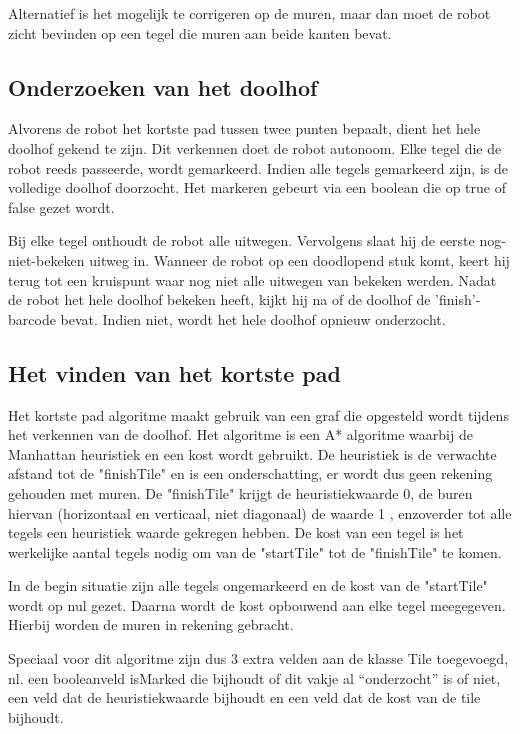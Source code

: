 \documentclass[tt3]{penoverslag}
\begin{document}
Alternatief is het mogelijk te corrigeren op de muren, maar dan moet de robot zicht bevinden op een tegel die muren aan beide kanten bevat.


\subsection{Onderzoeken van het doolhof} %
\label{ssec:algoOnderzDoolhof}
Alvorens de robot het kortste pad tussen twee punten bepaalt, dient het hele doolhof gekend te zijn. Dit verkennen doet de robot autonoom. Elke tegel die de robot reeds passeerde, wordt gemarkeerd. Indien alle tegels gemarkeerd zijn, is de volledige doolhof doorzocht. Het markeren gebeurt via een boolean die op true of false gezet wordt.

Bij elke tegel onthoudt de robot alle uitwegen. Vervolgens slaat hij de eerste nog-niet-bekeken uitweg in. Wanneer de robot op een doodlopend stuk komt, keert hij terug tot een kruispunt waar nog niet alle uitwegen van bekeken werden.
Nadat de robot het hele doolhof bekeken heeft, kijkt hij na of de doolhof de 'finish'-barcode bevat. Indien niet, wordt het hele doolhof opnieuw onderzocht.

\subsection{Het vinden van het kortste pad} %
\label{ssec:AlgoKortsteP}

Het kortste pad algoritme maakt gebruik van een graf die opgesteld wordt tijdens het verkennen van de doolhof. Het algoritme is een A* algoritme waarbij de Manhattan heuristiek en een kost wordt gebruikt.
De heuristiek is de verwachte afstand tot de "finishTile" en is een onderschatting, er wordt dus geen rekening gehouden met muren. De "finishTile" krijgt de heuristiekwaarde 0, de buren hiervan (horizontaal en verticaal, niet diagonaal) de waarde 1 , enzoverder tot alle tegels een heuristiek waarde gekregen hebben.
De kost van een tegel is het werkelijke aantal tegels nodig om van de "startTile" tot de "finishTile" te komen.

In de begin situatie zijn alle tegels ongemarkeerd en de kost van de "startTile" wordt op nul gezet. Daarna wordt de kost opbouwend aan elke tegel meegegeven. Hierbij worden de muren in rekening gebracht.

Speciaal voor dit algoritme zijn dus 3 extra velden aan de klasse Tile toegevoegd, nl. een booleanveld isMarked die bijhoudt of dit vakje al “onderzocht” is of niet, een veld dat de heuristiekwaarde bijhoudt en een veld dat de kost van de tile bijhoudt.
\end{document}
